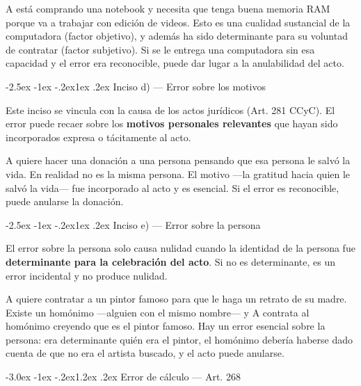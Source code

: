 \documentclass[12pt,oneside]{book}
\makeatletter
\renewcommand\section{\@startsection{section}{1}{\z@}%
  {-3.0ex \@plus -1ex \@minus -.2ex}{1.2ex \@plus .2ex}%
  {\normalfont\large\bfseries\color{acento}}}
\renewcommand\subsection{\@startsection{subsection}{2}{\z@}%
  {-2.5ex \@plus -1ex \@minus -.2ex}{1ex \@plus .2ex}%
  {\normalfont\normalsize\bfseries}}
\makeatother
\begin{document}
\begin{ejemplo}
A está comprando una notebook y necesita que tenga buena memoria RAM porque va a trabajar con edición de videos. Esto es una cualidad sustancial de la computadora (factor objetivo), y además ha sido determinante para su voluntad de contratar (factor subjetivo). Si se le entrega una computadora sin esa capacidad y el error era reconocible, puede dar lugar a la anulabilidad del acto.
\end{ejemplo}

\subsection{Inciso d) --- Error sobre los motivos}

Este inciso se vincula con la causa de los actos jurídicos (Art. 281 CCyC). El error puede recaer sobre los \textbf{motivos personales relevantes} que hayan sido incorporados expresa o tácitamente al acto.

\begin{ejemplo}
A quiere hacer una donación a una persona pensando que esa persona le salvó la vida. En realidad no es la misma persona. El motivo ---la gratitud hacia quien le salvó la vida--- fue incorporado al acto y es esencial. Si el error es reconocible, puede anularse la donación.
\end{ejemplo}

\subsection{Inciso e) --- Error sobre la persona}

El error sobre la persona solo causa nulidad cuando la identidad de la persona fue \textbf{determinante para la celebración del acto}. Si no es determinante, es un error incidental y no produce nulidad.

\begin{ejemplo}
A quiere contratar a un pintor famoso para que le haga un retrato de su madre. Existe un homónimo ---alguien con el mismo nombre--- y A contrata al homónimo creyendo que es el pintor famoso. Hay un error esencial sobre la persona: era determinante quién era el pintor, el homónimo debería haberse dado cuenta de que no era el artista buscado, y el acto puede anularse.
\end{ejemplo}

\section{Error de cálculo --- Art. 268}
\end{document}
